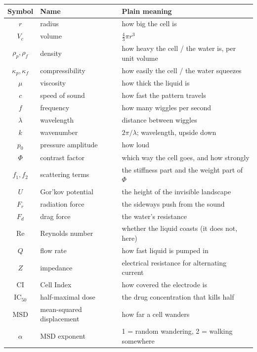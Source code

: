 \documentclass[11pt,a4paper]{article}
\begin{document}
\begin{center}\small
\begin{tabular}{cll}
\toprule
\textbf{Symbol} & \textbf{Name} & \textbf{Plain meaning} \\
\midrule
$r$ & radius & how big the cell is \\
$V_c$ & volume & $\tfrac43\pi r^3$ \\
$\rho_p,\rho_f$ & density & how heavy the cell / the water is, per unit volume \\
$\kappa_p,\kappa_f$ & compressibility & how easily the cell / the water squeezes \\
$\mu$ & viscosity & how thick the liquid is \\
$c$ & speed of sound & how fast the pattern travels \\
$f$ & frequency & how many wiggles per second \\
$\lambda$ & wavelength & distance between wiggles \\
$k$ & wavenumber & $2\pi/\lambda$; wavelength, upside down \\
$p_0$ & pressure amplitude & how loud \\
$\Phi$ & contrast factor & which way the cell goes, and how strongly \\
$f_1,f_2$ & scattering terms & the stiffness part and the weight part of $\Phi$ \\
$U$ & Gor'kov potential & the height of the invisible landscape \\
$F_r$ & radiation force & the sideways push from the sound \\
$F_d$ & drag force & the water's resistance \\
$\mathrm{Re}$ & Reynolds number & whether the liquid coasts (it does not, here) \\
$Q$ & flow rate & how fast liquid is pumped in \\
$Z$ & impedance & electrical resistance for alternating current \\
$\mathrm{CI}$ & Cell Index & how covered the electrode is \\
$\mathrm{IC}_{50}$ & half-maximal dose & the drug concentration that kills half \\
$\mathrm{MSD}$ & mean-squared displacement & how far a cell wanders \\
$\alpha$ & MSD exponent & 1 = random wandering, 2 = walking somewhere \\
\bottomrule
\end{tabular}
\end{center}
\end{document}

